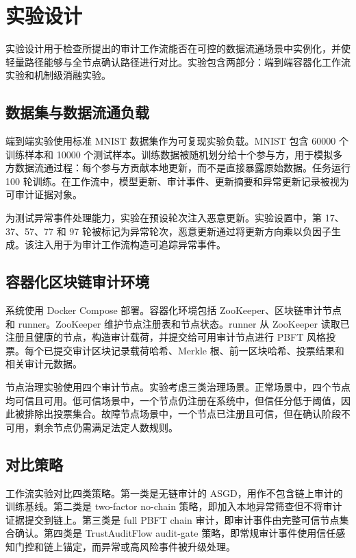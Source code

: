 \section{实验设计}

实验设计用于检查所提出的审计工作流能否在可控的数据流通场景中实例化，并使轻量路径能够与全节点确认路径进行对比。实验包含两部分：端到端容器化工作流实验和机制级消融实验。

\subsection{数据集与数据流通负载}

端到端实验使用标准 MNIST 数据集作为可复现实验负载。MNIST 包含 60000 个训练样本和 10000 个测试样本。训练数据被随机划分给十个参与方，用于模拟多方数据流通过程：每个参与方贡献本地更新，而不是直接暴露原始数据。任务运行 100 轮训练。在工作流中，模型更新、审计事件、更新摘要和异常更新记录被视为可审计证据对象。

为测试异常事件处理能力，实验在预设轮次注入恶意更新。实验设置中，第 17、37、57、77 和 97 轮被标记为异常轮次，恶意更新通过将更新方向乘以负因子生成。该注入用于为审计工作流构造可追踪异常事件。

\subsection{容器化区块链审计环境}

系统使用 Docker Compose 部署。容器化环境包括 ZooKeeper、区块链审计节点和 runner。ZooKeeper 维护节点注册表和节点状态。runner 从 ZooKeeper 读取已注册且健康的节点，构造审计载荷，并提交给可用审计节点进行 PBFT 风格投票。每个已提交审计区块记录载荷哈希、Merkle 根、前一区块哈希、投票结果和相关审计元数据。

节点治理实验使用四个审计节点。实验考虑三类治理场景。正常场景中，四个节点均可信且可用。低可信场景中，一个节点仍注册在系统中，但信任分低于阈值，因此被排除出投票集合。故障节点场景中，一个节点已注册且可信，但在确认阶段不可用，剩余节点仍需满足法定人数规则。

\subsection{对比策略}

工作流实验对比四类策略。第一类是无链审计的 ASGD，用作不包含链上审计的训练基线。第二类是 two-factor no-chain 策略，即加入本地异常筛查但不将审计证据提交到链上。第三类是 full PBFT chain 审计，即审计事件由完整可信节点集合确认。第四类是 TrustAuditFlow audit-gate 策略，即常规审计事件使用信任感知门控和链上锚定，而异常或高风险事件被升级处理。

